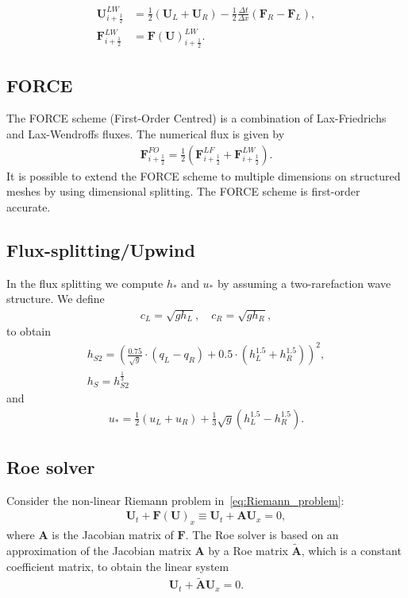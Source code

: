 \begin{equation}
    \begin{aligned}
        \mathbf{U}_{i+ \frac{1}{2}}^{LW} &= \frac{1}{2} \left( \mathbf{U}_{L} + \mathbf{U}_{R}  \right) - \frac{1}{2} \frac{\Delta t}{\Delta x} \left( {\mathbf{F}}_{R} - {\mathbf{F}}_{L} \right), \\
        \mathbf{F}_{i+\frac{1}{2}}^{LW} &= {{}\mathbf{F}{(\mathbf{U})}_{i+ \frac{1}{2}}^{LW}}.
    \end{aligned}
\end{equation}



\subsection{FORCE}
The FORCE scheme (First-Order Centred) is a combination of Lax-Friedrichs and Lax-Wendroffs fluxes.
The numerical flux is given by
\begin{align*}
    \mathbf{F}_{i+ \frac{1}{2}}^{FO} = \frac{1}{2} \left( \mathbf{F}_{i+ \frac{1}{2}}^{LF} + \mathbf{F}_{i + \frac{1}{2}}^{LW}  \right).
\end{align*}
It is possible to extend the FORCE scheme to multiple dimensions on structured meshes by using dimensional splitting.
The FORCE scheme is first-order accurate.




\subsection{Flux-splitting/Upwind}
In the flux splitting we compute $h_*$ and $u_*$ by assuming a two-rarefaction wave structure.
We define 
\begin{align*}
    c_L = \sqrt{g h_L}, \quad c_R = \sqrt{g h_R},
\end{align*}
to obtain
\begin{align*}
    h_{S2} = {\left( \frac{0.75}{\sqrt{g}} \cdot (q_L - q_R) + 0.5 \cdot \left(h_L^{1.5} + h_R^{1.5}\right) \right)}^2, \\
    h_{S} = h_{S2}^{\frac{1}{3}}
\end{align*}
and
\begin{align*}
    u_* = \frac{1}{2} (u_L + u_R) + \frac{1}{3} \sqrt{g} (h_L^{1.5} - h_R^{1.5}).
\end{align*}




\subsection{Roe solver}
Consider the non-linear Riemann problem in~\eqref{eq:Riemann_problem}:
\begin{align*}
    \mathbf{U}_t + \mathbf{F(U)}_x \equiv \mathbf{U}_t + \mathbf{A} \mathbf{U}_x = 0,
\end{align*}
where $\mathbf{A}$ is the Jacobian matrix of $\mathbf{F}$. 
The Roe solver is based on an approximation of the Jacobian matrix $\mathbf{A}$ by a Roe matrix $\tilde{\mathbf{A}}$, which is a constant coefficient matrix, to obtain the linear system
\begin{align*}
    \mathbf{U}_t + \mathbf{\tilde{A}} \mathbf{U}_x = 0.
\end{align*}

